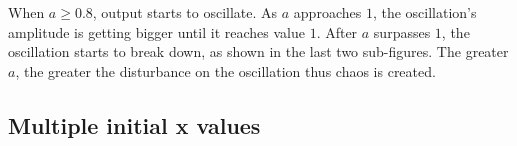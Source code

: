 When $a \ge 0.8$, output starts to oscillate. As $a$ approaches $1$, the oscillation's amplitude is getting bigger until it reaches value $1$.
After $a$ surpasses $1$, the oscillation starts to break down, as shown in the last two sub-figures. The greater $a$, the greater the disturbance on the oscillation thus chaos is created.

\subsection{Multiple initial x values}

